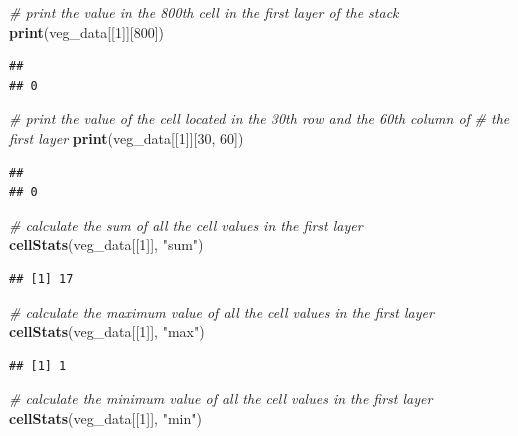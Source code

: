 \documentclass[12pt,]{book}
\newenvironment{Shaded}{\begin{snugshade}}{\end{snugshade}}
\newcommand{\CommentTok}[1]{\textcolor[rgb]{0.56,0.35,0.01}{\textit{#1}}}
\newcommand{\DecValTok}[1]{\textcolor[rgb]{0.00,0.00,0.81}{#1}}
\newcommand{\KeywordTok}[1]{\textcolor[rgb]{0.13,0.29,0.53}{\textbf{#1}}}
\newcommand{\NormalTok}[1]{#1}
\newcommand{\StringTok}[1]{\textcolor[rgb]{0.31,0.60,0.02}{#1}}
\begin{document}
\begin{Shaded}
\begin{Highlighting}[]
\CommentTok{# print the value in the 800th cell in the first layer of the stack}
\KeywordTok{print}\NormalTok{(veg_data[[}\DecValTok{1}\NormalTok{]][}\DecValTok{800}\NormalTok{])}
\end{Highlighting}
\end{Shaded}

\begin{verbatim}
##   
## 0
\end{verbatim}

\begin{Shaded}
\begin{Highlighting}[]
\CommentTok{# print the value of the cell located in the 30th row and the 60th column of}
\CommentTok{# the first layer}
\KeywordTok{print}\NormalTok{(veg_data[[}\DecValTok{1}\NormalTok{]][}\DecValTok{30}\NormalTok{, }\DecValTok{60}\NormalTok{])}
\end{Highlighting}
\end{Shaded}

\begin{verbatim}
##   
## 0
\end{verbatim}

\begin{Shaded}
\begin{Highlighting}[]
\CommentTok{# calculate the sum of all the cell values in the first layer}
\KeywordTok{cellStats}\NormalTok{(veg_data[[}\DecValTok{1}\NormalTok{]], }\StringTok{"sum"}\NormalTok{)}
\end{Highlighting}
\end{Shaded}

\begin{verbatim}
## [1] 17
\end{verbatim}

\begin{Shaded}
\begin{Highlighting}[]
\CommentTok{# calculate the maximum value of all the cell values in the first layer}
\KeywordTok{cellStats}\NormalTok{(veg_data[[}\DecValTok{1}\NormalTok{]], }\StringTok{"max"}\NormalTok{)}
\end{Highlighting}
\end{Shaded}

\begin{verbatim}
## [1] 1
\end{verbatim}

\begin{Shaded}
\begin{Highlighting}[]
\CommentTok{# calculate the minimum value of all the cell values in the first layer}
\KeywordTok{cellStats}\NormalTok{(veg_data[[}\DecValTok{1}\NormalTok{]], }\StringTok{"min"}\NormalTok{)}
\end{Highlighting}
\end{Shaded}
\end{document}
